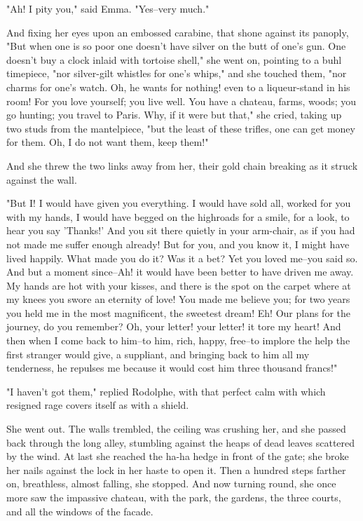 \documentclass[11pt,twocolumn]{ltugboat}
\begin{document}
"Ah! I pity you," said Emma. "Yes--very much."

And fixing her eyes upon an embossed carabine, that shone against its
panoply, "But when one is so poor one doesn't have silver on the butt of
one's gun. One doesn't buy a clock inlaid with tortoise shell," she went
on, pointing to a buhl timepiece, "nor silver-gilt whistles for one's
whips," and she touched them, "nor charms for one's watch. Oh, he wants
for nothing! even to a liqueur-stand in his room! For you love yourself;
you live well. You have a chateau, farms, woods; you go hunting; you
travel to Paris. Why, if it were but that," she cried, taking up two
studs from the mantelpiece, "but the least of these trifles, one can get
money for them. Oh, I do not want them, keep them!"

And she threw the two links away from her, their gold chain breaking as
it struck against the wall.

"But I! I would have given you everything. I would have sold all, worked
for you with my hands, I would have begged on the highroads for a smile,
for a look, to hear you say 'Thanks!' And you sit there quietly in your
arm-chair, as if you had not made me suffer enough already! But for you,
and you know it, I might have lived happily. What made you do it? Was
it a bet? Yet you loved me--you said so. And but a moment since--Ah!
it would have been better to have driven me away. My hands are hot with
your kisses, and there is the spot on the carpet where at my knees you
swore an eternity of love! You made me believe you; for two years you
held me in the most magnificent, the sweetest dream! Eh! Our plans for
the journey, do you remember? Oh, your letter! your letter! it tore my
heart! And then when I come back to him--to him, rich, happy, free--to
implore the help the first stranger would give, a suppliant, and
bringing back to him all my tenderness, he repulses me because it would
cost him three thousand francs!"

"I haven't got them," replied Rodolphe, with that perfect calm with
which resigned rage covers itself as with a shield.

She went out. The walls trembled, the ceiling was crushing her, and she
passed back through the long alley, stumbling against the heaps of dead
leaves scattered by the wind. At last she reached the ha-ha hedge in
front of the gate; she broke her nails against the lock in her haste to
open it. Then a hundred steps farther on, breathless, almost falling,
she stopped. And now turning round, she once more saw the impassive
chateau, with the park, the gardens, the three courts, and all the
windows of the facade.
\end{document}
